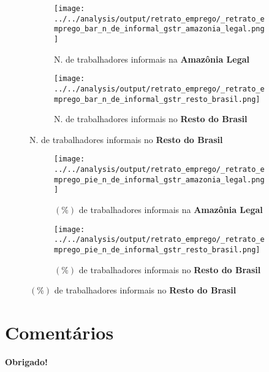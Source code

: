 \documentclass[11pt]{beamer}
\begin{document}
\begin{frame}[label=_retrato_emprego_bar_n_de_informal_gstr]{}
\textit{\hyperlink{indice_principal}{}}
\begin{figure}
\centering
\begin{subfigure}{.5\textwidth}
  \centering
  \texttt{[image: ../../analysis/output/retrato\_emprego/\_retrato\_emprego\_bar\_n\_de\_informal\_gstr\_amazonia\_legal.png]}
  \label{fig:_retrato_emprego_bar_n_de_informal_gstr_amazonia_legal}
  \caption{{\tiny N. de trabalhadores informais na \textbf{Amazônia Legal}}}
\end{subfigure}%
\begin{subfigure}{.5\textwidth}
  \centering
  \texttt{[image: ../../analysis/output/retrato\_emprego/\_retrato\_emprego\_bar\_n\_de\_informal\_gstr\_resto\_brasil.png]}
  \label{fig:_retrato_emprego_bar_n_de_informal_gstr_resto_brasil}
   \caption{{\tiny N. de trabalhadores informais no \textbf{Resto do Brasil}}}
\end{subfigure}
\end{figure}
\end{frame}


\begin{frame}[label=_retrato_emprego_pie_n_de_informal_gstr]{}
\textit{\hyperlink{indice_principal}{}}
\begin{figure}
\centering
\begin{subfigure}{.5\textwidth}
  \centering
  \texttt{[image: ../../analysis/output/retrato\_emprego/\_retrato\_emprego\_pie\_n\_de\_informal\_gstr\_amazonia\_legal.png]}
  \label{fig:_retrato_emprego_pie_n_de_informal_gstr_amazonia_legal}
  \caption{{\tiny $(\%)$ de trabalhadores informais na \textbf{Amazônia Legal}}}
\end{subfigure}%
\begin{subfigure}{.5\textwidth}
  \centering
  \texttt{[image: ../../analysis/output/retrato\_emprego/\_retrato\_emprego\_pie\_n\_de\_informal\_gstr\_resto\_brasil.png]}
  \label{fig:_retrato_emprego_pie_n_de_informal_gstr_resto_brasil}
   \caption{{\tiny $(\%)$ de trabalhadores informais no \textbf{Resto do Brasil}}}
\end{subfigure}
\end{figure}
\end{frame}

\section{Comentários}


\frame
{
    \begin{center}
     \vfill
    \textbf{Obrigado!}
     \\

     \begin{small}
     \end{small}
     \vfill
\end{center}
}
\end{document}

